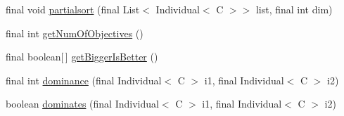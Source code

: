 \begin{DoxyCompactItemize}
\item 
final void \hyperlink{classjenes_1_1population_1_1_fitness_3_01_c_01extends_01_chromosome_01_4_a1f054be21d8801e9485f7ba08ff62db4}{partialsort} (final List$<$ Individual$<$ C $>$$>$ list, final int dim)
\item 
final int \hyperlink{classjenes_1_1population_1_1_fitness_3_01_c_01extends_01_chromosome_01_4_a2c1cb27db38fde35b764b0bf88e7c7f3}{get\-Num\-Of\-Objectives} ()
\item 
final boolean\mbox{[}$\,$\mbox{]} \hyperlink{classjenes_1_1population_1_1_fitness_3_01_c_01extends_01_chromosome_01_4_a87d1d2a0a3758dbaedd78197c335e6a5}{get\-Bigger\-Is\-Better} ()
\item 
final int \hyperlink{classjenes_1_1population_1_1_fitness_3_01_c_01extends_01_chromosome_01_4_a2027cd00c84c69e1819236ad488a5ab9}{dominance} (final Individual$<$ C $>$ i1, final Individual$<$ C $>$ i2)
\item 
boolean \hyperlink{classjenes_1_1population_1_1_fitness_3_01_c_01extends_01_chromosome_01_4_aafc7666adbe84d7683f1de729b1a3ca5}{dominates} (final Individual$<$ C $>$ i1, final Individual$<$ C $>$ i2)
\end{DoxyCompactItemize}
